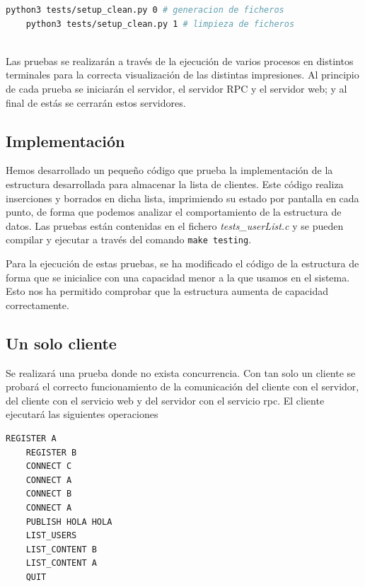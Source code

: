 \documentclass[]{article}
\begin{document}
\begin{lstlisting}[caption=Generar/limpiar ficheros de prueba y entradas de terminal, language=bash]
    python3 tests/setup_clean.py 0 # generacion de ficheros
    python3 tests/setup_clean.py 1 # limpieza de ficheros
    
\end{lstlisting}

Las pruebas se realizarán a través de la ejecución de varios procesos en distintos terminales para la correcta visualización de las distintas impresiones. Al principio de cada prueba se iniciarán el servidor, el servidor RPC y el servidor web; y al final de estás se cerrarán estos servidores.
\subsection{Implementación}
\label{subsec:imp}
Hemos desarrollado un pequeño código que prueba la implementación de la estructura desarrollada para almacenar la lista de clientes. Este código realiza inserciones y borrados en dicha lista, imprimiendo su estado por pantalla en cada punto, de forma que podemos analizar el comportamiento de la estructura de datos. Las pruebas están contenidas en el fichero \textit{tests\_userList.c} y se pueden compilar y ejecutar a través del comando \texttt{make testing}. 

Para la ejecución de estas pruebas, se ha modificado el código de la estructura de forma que se inicialice con una capacidad menor a la que usamos en el sistema. Esto nos ha permitido comprobar que la estructura aumenta de capacidad correctamente.

\subsection{Un solo cliente}
\label{subsection:1_cliente}
Se realizará una prueba donde no exista concurrencia. Con tan solo un cliente se probará el correcto funcionamiento de la comunicación del cliente con el servidor, del cliente con el servicio web y del servidor con el servicio rpc.
El cliente ejecutará las siguientes operaciones
\begin{lstlisting}[caption=Operaciones a realizar por el cliente]
    REGISTER A
    REGISTER B
    CONNECT C
    CONNECT A
    CONNECT B
    CONNECT A
    PUBLISH HOLA HOLA 
    LIST_USERS
    LIST_CONTENT B
    LIST_CONTENT A
    QUIT
\end{lstlisting}
\end{document}
